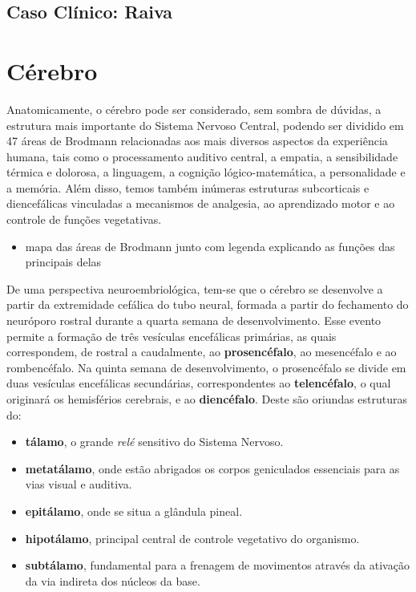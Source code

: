 \documentclass[
]{book}
\providecommand{\tightlist}{%
  \setlength{\itemsep}{0pt}\setlength{\parskip}{0pt}}
\theoremstyle{definition}
\theoremstyle{definition}
\theoremstyle{definition}
\theoremstyle{definition}
\theoremstyle{remark}
\begin{document}
\hypertarget{caso-cluxednico-raiva}{%
\section{Caso Clínico: Raiva}\label{caso-cluxednico-raiva}}

\hypertarget{cuxe9rebro}{%
\chapter{Cérebro}\label{cuxe9rebro}}

Anatomicamente, o cérebro pode ser considerado, sem sombra de dúvidas, a estrutura mais importante do Sistema Nervoso Central, podendo ser dividido em 47 áreas de Brodmann relacionadas aos mais diversos aspectos da experiência humana, tais como o processamento auditivo central, a empatia, a sensibilidade térmica e dolorosa, a linguagem, a cognição lógico-matemática, a personalidade e a memória. Além disso, temos também inúmeras estruturas subcorticais e diencefálicas vinculadas a mecanismos de analgesia, ao aprendizado motor e ao controle de funções vegetativas.

\begin{itemize}
\tightlist
\item
  mapa das áreas de Brodmann junto com legenda explicando as funções das principais delas
\end{itemize}

De uma perspectiva neuroembriológica, tem-se que o cérebro se desenvolve a partir da extremidade cefálica do tubo neural, formada a partir do fechamento do neuróporo rostral durante a quarta semana de desenvolvimento. Esse evento permite a formação de três vesículas encefálicas primárias, as quais correspondem, de rostral a caudalmente, ao \textbf{prosencéfalo}, ao mesencéfalo e ao rombencéfalo. Na quinta semana de desenvolvimento, o prosencéfalo se divide em duas vesículas encefálicas secundárias, correspondentes ao \textbf{telencéfalo}, o qual originará os hemisférios cerebrais, e ao \textbf{diencéfalo}. Deste são oriundas estruturas do:

\begin{itemize}
\tightlist
\item
  \textbf{tálamo}, o grande \emph{relé} sensitivo do Sistema Nervoso.
\item
  \textbf{metatálamo}, onde estão abrigados os corpos geniculados essenciais para as vias visual e auditiva.
\item
  \textbf{epitálamo}, onde se situa a glândula pineal.
\item
  \textbf{hipotálamo}, principal central de controle vegetativo do organismo.
\item
  \textbf{subtálamo}, fundamental para a frenagem de movimentos através da ativação da via indireta dos núcleos da base.
\end{itemize}
\end{document}
